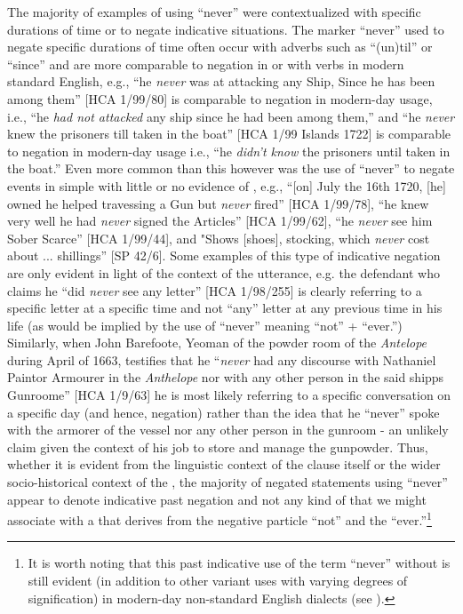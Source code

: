 The majority of examples of using “never” were contextualized with specific durations of time or to negate indicative  situations. The marker “never” used to negate specific durations of time often occur with adverbs such as “(un)til” or “since” and are more comparable to negation in  or with  verbs in modern standard English, e.g., “he \textit{never} was at attacking any Ship, Since he has been among them” [HCA 1/99/80] is comparable to  negation in modern-day usage, i.e., “he \textit{had not attacked} any ship since he had been among them,” and “he \textit{never} knew the prisoners till taken in the boat” [HCA 1/99  Islands 1722] is comparable to  negation in modern-day usage i.e., “he \textit{didn't know} the prisoners until taken in the boat.” Even more common than this however was the use of “never” to negate events in simple  with little or no evidence of , e.g., “[on] July the 16th 1720, [he] owned he helped travessing a Gun but \textit{never} fired” [HCA 1/99/78], “he knew very well he had \textit{never} signed the Articles” [HCA 1/99/62], “he \textit{never} see him Sober Scarce” [HCA 1/99/44], and "Shows [shoes], stocking, which \textit{never} cost about ... shillings” [SP 42/6]. Some examples of this type of indicative  negation are only evident in light of the context of the utterance, e.g. the defendant who claims he “did \textit{never} see any letter” [HCA 1/98/255] is clearly referring to a specific letter at a specific time and not “any” letter at any previous time in his life (as would be implied by the use of “never” meaning “not” + “ever.”) Similarly, when John Barefoote, Yeoman of the powder room of the \textit{Antelope} during April of 1663, testifies that he “\textit{never} had any discourse with Nathaniel Paintor Armourer in the \textit{Anthelope} nor with any other person in the said shipps Gunroome” [HCA 1/9/63] he is most likely referring to a specific conversation on a specific day (and hence,  negation) rather than the idea that he “never” spoke with the armorer of the vessel nor any other person in the gunroom - an unlikely claim given the context of his job to store and manage the gunpowder. Thus, whether it is evident from the linguistic context of the clause itself or the wider socio-historical context of the , the majority of negated statements using “never” appear to denote indicative past negation and not any kind of  that we might associate with a  that derives from the negative particle “not” and the  “ever.”\footnote{It is worth noting that this past indicative use of the term “never” without  is still evident (in addition to other variant uses with varying degrees of  signification) in modern-day non-standard English dialects (see \citealt{LucasWills2012,Mazzen2004}).}  

